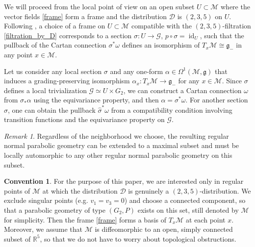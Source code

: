 \documentclass{amsart}
\theoremstyle{plain}
\theoremstyle{definition}
\newtheorem*{convention}{Convention}
\theoremstyle{remark}
\newtheorem*{remark}{Remark}
\newcommand{\R}{\mathbb{R}}
\newcommand{\mc}[1]{\mathcal{#1}}
\newcommand{\mfk}[1]{\mathfrak{#1}}
\newcommand{\on}[1]{\operatorname{#1}}
\begin{document}
We will proceed from the local point of view on an open subset $U \subset \mc{M}$ where the vector fields \eqref{frame} form a frame and the distribution $\mc{D}$ is $(2,3,5)$ on $U$. Following \cite[p.]{parabook},
a choice of a frame on $U \subset \mc{M}$ compatible with the $(2,3,5)$-filtration \eqref{filtration_by_D} corresponds to a section $\sigma\colon U \to \mc{G}$, $p \circ \sigma = \on{id}_U$, such that the pullback of the Cartan connection $\sigma^*\omega$ defines an isomorphism of $T_x\mc{M} \cong \mfk{g}_-$ in any point $x \in \mc{M}$.

Let us consider any local section $\sigma$ and any one-form $\alpha \in \Omega^1(\mc{M},\mfk{g})$ that induces a grading-preserving isomorphism $\alpha_x \colon T_x\mc{M} \to \mfk{g}_-$ for any $x \in \mc{M}$. Since $\sigma$ defines a local trivialization $\mc{G} \simeq U \times G_2$, we can construct a Cartan connection $\omega$ from $\sigma_* \alpha$ using the equivariance property, and then $\alpha = \sigma^* \omega$. For another section $\hat\sigma$, one can obtain the pullback $\hat{\sigma}^*\omega$ from a compatibility condition involving transition functions and the equivariance property on $\mc{G}$.

\begin{remark}
    Regardless of the neighborhood we choose, the resulting regular normal parabolic geometry can be extended to a maximal subset and must be locally automorphic to any other regular normal parabolic geometry on this subset.
\end{remark}

\begin{convention}
    For the purpose of this paper, we are interested only in regular points of $\mc{M}$ at which the distribution $\mc{D}$ is genuinely a $(2,3,5)$-distribution. We exclude singular points (e.g.\! $v_1 = v_3 = 0$) and choose a connected component, so that a parabolic geometry of type $(G_2,P)$ exists on this set, still denoted by $\mc{M}$ for simplicity. Then the frame \eqref{frame} forms a basis of $T_x\mc{M}$ at each point $x$. Moreover, we assume that $\mc{M}$ is diffeomorphic to an open, simply connected subset of $\R^5$, so that we do not have to worry about topological obstructions.
\end{convention}
\end{document}
